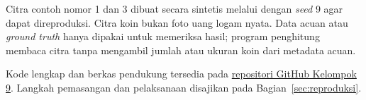 Citra contoh nomor 1 dan 3 dibuat secara sintetis melalui 
dengan \textit{seed} 9 agar dapat direproduksi. Citra koin bukan foto uang
logam nyata. Data acuan atau \textit{ground truth} hanya dipakai untuk
memeriksa hasil; program penghitung membaca citra tanpa mengambil jumlah
atau ukuran koin dari metadata acuan.

Kode lengkap dan berkas pendukung tersedia pada
\href{https://github.com/Bambang-code/uts-pcd-kelompok-9}{repositori GitHub Kelompok 9}.
Langkah pemasangan dan pelaksanaan disajikan pada
Bagian~\ref{sec:reproduksi}.
